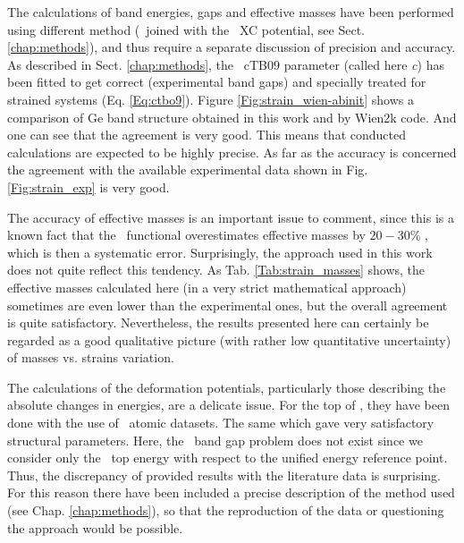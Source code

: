 The calculations of band energies, gaps and effective masses have been performed using different method (\HGH\ joined with the \mBJLDA\ XC potential, see Sect. \ref{chap:methods}), and thus require a separate discussion of precision and accuracy.
As described in Sect. \ref{chap:methods}, the \mBJLDA\ cTB$09$ parameter (called here \textit{c}) has been fitted to get correct (experimental band gaps) and specially treated for strained systems (Eq. \ref{Eq:ctbo9}).
Figure \ref{Fig:strain_wien-abinit} shows a comparison of Ge band structure obtained in this work and by Wien2k code.
And one can see that the agreement is very good.
This means that conducted calculations are expected to be highly precise.
As far as the accuracy is concerned the agreement with the available experimental data shown in Fig. \ref{Fig:strain_exp} is very good. 

The accuracy of effective masses is an important issue to comment, since this is a known fact that the \mBJLDA\ functional overestimates effective masses by $20-30\%$ \cite{mbjlda_precision}, which is then a systematic error.
Surprisingly, the approach used in this work does not quite reflect this tendency.
As Tab. \ref{Tab:strain_masses} shows, the effective masses calculated here (in a very strict mathematical approach) sometimes are even lower than the experimental ones, but the overall agreement is quite satisfactory.
Nevertheless, the results presented here can certainly be regarded as a good qualitative picture (with rather low quantitative uncertainty) of masses vs. strains variation.

The calculations of the deformation potentials, particularly those describing the absolute changes in energies, are a delicate issue.
For the top of \VB, they have been done with the use of \PAW\ atomic datasets.
The same which gave very satisfactory structural parameters.
Here, the \DFT\ band gap problem does not exist since we consider only the \VB\ top energy with respect to the unified energy reference point.
Thus, the discrepancy of provided results with the literature data is surprising.
For this reason there have been included a precise description of the method used (see Chap. \ref{chap:methods}), so that the reproduction of the data or questioning the approach would be possible.

\ornament